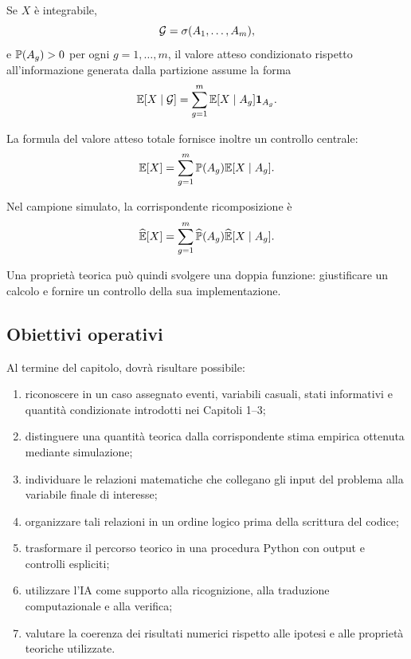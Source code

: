 Se $X$ \`{e} integrabile,
\[
\mathcal{G}=\sigma(A_1,\ldots,A_m),
\]
e $\mathbb{P}(A_g)>0$ per ogni $g=1,\ldots,m$, il valore atteso condizionato
rispetto all'informazione generata dalla partizione assume la forma
\[
\mathbb{E}[X\mid\mathcal{G}]
=
\sum_{g=1}^{m}
\mathbb{E}[X\mid A_g]\mathbf{1}_{A_g}.
\]

La formula del valore atteso totale fornisce inoltre un controllo centrale:
\[
\mathbb{E}[X]
=
\sum_{g=1}^{m}
\mathbb{P}(A_g)\mathbb{E}[X\mid A_g].
\]

Nel campione simulato, la corrispondente ricomposizione \`{e}
\[
\widehat{\mathbb{E}}[X]
=
\sum_{g=1}^{m}
\widehat{\mathbb{P}}(A_g)
\widehat{\mathbb{E}}[X\mid A_g].
\]

Una propriet\`{a} teorica pu\`{o} quindi svolgere una doppia funzione:
giustificare un calcolo e fornire un controllo della sua implementazione.

\subsection{Obiettivi operativi}

Al termine del capitolo, dovr\`{a} risultare possibile:

\begin{enumerate}
\item riconoscere in un caso assegnato eventi, variabili casuali, stati
informativi e quantit\`{a} condizionate introdotti nei Capitoli 1--3;

\item distinguere una quantit\`{a} teorica dalla corrispondente stima empirica
ottenuta mediante simulazione;

\item individuare le relazioni matematiche che collegano gli input del problema
alla variabile finale di interesse;

\item organizzare tali relazioni in un ordine logico prima della scrittura del
codice;

\item trasformare il percorso teorico in una procedura Python con output e
controlli espliciti;

\item utilizzare l'IA come supporto alla ricognizione, alla traduzione
computazionale e alla verifica;

\item valutare la coerenza dei risultati numerici rispetto alle ipotesi e alle
propriet\`{a} teoriche utilizzate.
\end{enumerate}

